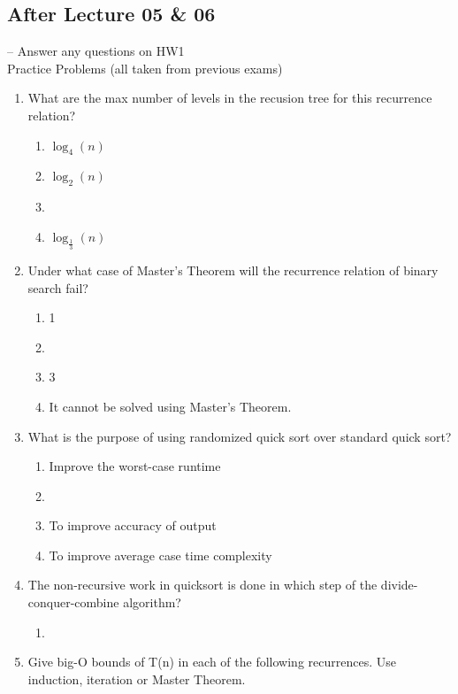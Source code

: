 \documentclass[12pt]{report}
\newcommand{\choicelabel}{\alph*)}
\begin{document}
\subsection{After Lecture 05 \& 06} -- Answer any questions on HW1\\
Practice Problems (all taken from previous exams)
\begin{enumerate}[label=\arabic*.]
	\item What are the max number of levels in the recusion tree for this recurrence relation?
	\begin{enumerate}[label=\alph*)]
	    \item $\log_{4}(n)$
	    \item $\log_{2}(n)$
	    \item {}
	    \item $\log_{\frac{1}{3}}(n)$
	\end{enumerate}
	\item Under what case of Master's Theorem will the recurrence relation of binary search fail?
	\begin{enumerate}[label=\choicelabel]
	    \item 1
		\item {}
		\item 3
		\item It cannot be solved using Master's Theorem.
	\end{enumerate}
	\item What is the purpose of using randomized quick sort over standard quick sort?
	\begin{enumerate}[label=\choicelabel]
	    \item Improve the worst-case runtime
		\item {}
		\item To improve accuracy of output
		\item To improve average case time complexity
	\end{enumerate}
	\item The non-recursive work in quicksort is done in which step of the divide-conquer-combine algorithm?
	\begin{enumerate}[label=\choicelabel]
	    \item
	\end{enumerate}
	\item Give big-O bounds of T(n) in each of the following recurrences. Use induction, iteration or Master Theorem.

\end{enumerate}
\end{document}

